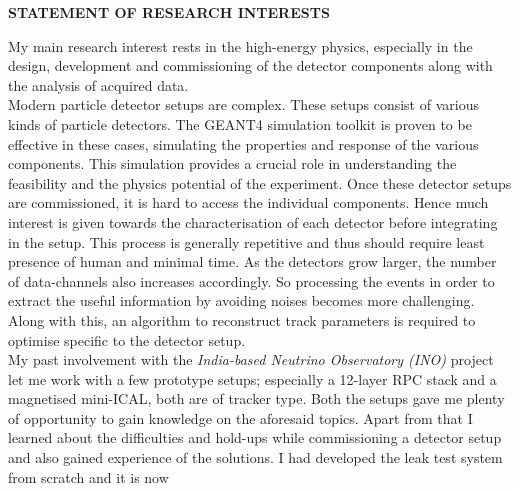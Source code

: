 \documentclass[12pt]{article}
\begin{document}
\pagebreak
\vspace{0.4cm}
\colorbox{gray!40}{\begin{minipage}{16.2cm}
\bf { STATEMENT OF RESEARCH INTERESTS} 
\end{minipage} }

\begin{justify}

  My main research interest rests in the high-energy physics, especially
  in the design, development and commissioning of the detector components
  along with the analysis of acquired data.\\
  \hspace*{0.6cm}
  Modern particle detector setups are complex. These
  setups consist of various kinds of particle detectors.
  The GEANT4 simulation toolkit is proven to be effective in these
  cases, simulating the properties and response of the various
  components. This simulation provides a crucial role in understanding
  the feasibility and the physics potential of the experiment.
  Once these detector setups are commissioned, it is hard to access the
  individual components. Hence much interest is given towards the
  characterisation of each detector before integrating in the setup.
  This process is generally repetitive and thus should require least
  presence of human and minimal time.
  As the detectors grow larger, the number of data-channels also
  increases accordingly. So processing the events in order to extract
  the useful information by avoiding noises
  becomes more challenging. Along with this, an algorithm to reconstruct
  track parameters is required to optimise specific to the detector
  setup.\\
  \hspace*{0.6cm}
  My past involvement with the {\it India-based Neutrino Observatory (INO)} project
  let me work with a few prototype setups; especially
  a 12-layer RPC stack and a magnetised
  mini-ICAL, both are of tracker type. Both the setups gave me plenty of
  opportunity to gain knowledge on the aforesaid topics. Apart from
  that I learned about the difficulties and hold-ups while commissioning
  a detector setup and also gained experience of the solutions.
  I had developed the leak test system from scratch and it is now

\end{justify}
\end{document}
